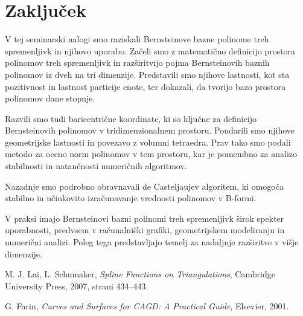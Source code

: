 \documentclass[11pt,a4paper]{article}
\begin{document}
\section{Zaključek}

V tej seminarski nalogi smo raziskali Bernsteinove bazne polinome treh spremenljivk in njihovo uporabo. Začeli smo z matematično definicijo prostora polinomov treh spremenljivk in razširitvijo pojma Bernsteinovih baznih polinomov iz dveh na tri dimenzije. Predstavili smo njihove lastnosti, kot sta pozitivnost in lastnost particije enote, ter dokazali, da tvorijo bazo prostora polinomov dane stopnje.

Razvili smo tudi baricentrične koordinate, ki so ključne za definicijo Bernsteinovih polinomov v tridimenzionalnem prostoru. Poudarili smo njihove geometrijske lastnosti in povezavo z volumni tetraedra. Prav tako smo podali metodo za oceno norm polinomov v tem prostoru, kar je pomembno za analizo stabilnosti in natančnosti numeričnih algoritmov.

Nazadnje smo podrobno obravnavali de Casteljaujev algoritem, ki omogoča stabilno in učinkovito izračunavanje vrednosti polinomov v B-formi. 

V praksi imajo Bernsteinovi bazni polinomi treh spremenljivk širok spekter uporabnosti, predvsem v računalniški grafiki, geometrijskem modeliranju in numerični analizi. Poleg tega predstavljajo temelj za nadaljnje razširitve v višje dimenzije.





\begin{thebibliography}{99}

    M. J. Lai, L. Schumaker, \textit{Spline Functions on Triangulations}, 
    Cambridge University Press, 2007, strani 434–443.

    G. Farin, \textit{Curves and Surfaces for CAGD: A Practical Guide}, 
    Elsevier, 2001.

\end{thebibliography}
\end{document}
